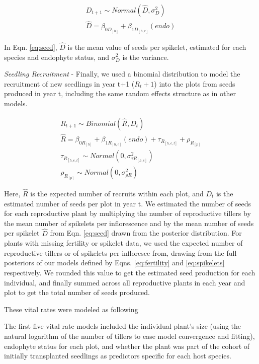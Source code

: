 \documentclass[12pt]{article}
\begin{document}
\begin{subequations} 
	\label{eq:seed}
	\begin{align}
		D_{t+1} \sim Normal(\hat{D}, \sigma^2_D) \\
		\hat{D} =  \beta_{0D_{[h]}} + \beta_{1D_{[h,e]}}(endo)
	\end{align}
\end{subequations}

In Eqn. \ref{eq:seed}, $\hat{D}$ is the mean value of seeds per spikelet, estimated for each species and endophyte status, and $\sigma^2_D$ is the variance.

\emph{Seedling Recruitment} - Finally, we used a binomial distribution to model the recruitment of new seedlings in year t+1 ($R_t+1$) into the plots from seeds produced in year t, including the same random effects structure as in other models.

\begin{subequations} 
	\label{eq:recruitment}
	\begin{align}
		R_{t+1} \sim Binomial(\hat{R}, D_t) \\
		\hat{R} =  \beta_{0R_{[h]}} + \beta_{1R_{[h,e]}}(endo) + \tau_{R_{[h,e,t]}} + \rho_{R_{[p]}} \\
		\tau_{R_{[h,e,t]}} \sim Normal(0, \sigma^2_{\tau R_{[h,e]}})\\
		\rho_{R_{[p]}} \sim Normal(0, \sigma^2_{\rho R})
	\end{align}
\end{subequations}

Here, $\hat{R}$ is the expected number of recruits within each plot, and $D_t$ is the estimated number of seeds per plot in year t. 
We estimated the number of seeds for each reproductive plant by multiplying the number of reproductive tillers by the mean number of spikelets per inflorescence and by the mean number of seeds per spikelet $\hat{D}$ from Eqn. \ref{eq:seed} drawn from the posterior distribution. 
For plants with missing fertility or spikelet data, we used the expected number of reproductive tillers or of spikelets per infloresce from, drawing from the full posteriors of our models defined by Eqns. \ref{eq:fertility} and \ref{eq:spikelets} respectively. 
We rounded this value to get the estimated seed production for each individual, and finally summed across all reproductive plants in each year and plot to get the total number of seeds produced. 


These vital rates were modeled as following

The first five vital rate models included the individual plant's size (using the natural logarithm of the number of tillers to ease model convergence and fitting), endophyte status for each plot, and whether the plant was part of the cohort of initially transplanted seedlings as predictors specific for each host species. 
\end{document}
